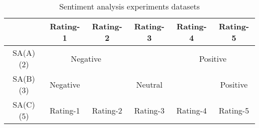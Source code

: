 \begin{table}[]
\centering
\caption{Sentiment analysis experiments datasets}
\begin{tabular}{|c|c|c|c|c|c|}
\hline
     & Rating-1      & Rating-2      & Rating-3 & Rating-4      & Rating-5      \\ \hline
SA(A)(2) & \multicolumn{2}{c|}{Negative} &          & \multicolumn{2}{c|}{Positive} \\ \hline
SA(B)(3) & Negative      &               & Neutral  &               & Positive      \\ \hline
SA(C)(5) & Rating-1      & Rating-2      & Rating-3 & Rating-4      & Rating-5      \\ \hline
\end{tabular}
\end{table}